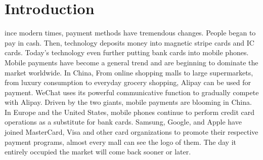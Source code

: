 \documentclass[journal]{IEEEtran}
\begin{document}
%
\IEEEpeerreviewmaketitle



% 
% 
% 
% 

 
\section{Introduction}
ince modern times, payment methods have tremendous changes. People began to pay in cash. Then, technology deposits money into magnetic stripe cards and IC cards. Today’s technology even further putting bank cards into mobile phones. Mobile payments have become a general trend and are beginning to dominate the market worldwide. In China, From online shopping malls to large supermarkets, from luxury consumption to everyday grocery shopping, Alipay can be used for payment. WeChat uses its powerful communicative function to gradually compete with Alipay. Driven by the two giants, mobile payments are blooming in China. In Europe and the United States, mobile phones continue to perform credit card operations as a substitute for bank cards. Samsung, Google, and Apple have joined MasterCard, Visa and other card organizations to promote their respective payment programs, almost every mall can see the logo of them. The day it entirely occupied the market will come back sooner or later.
\end{document}
